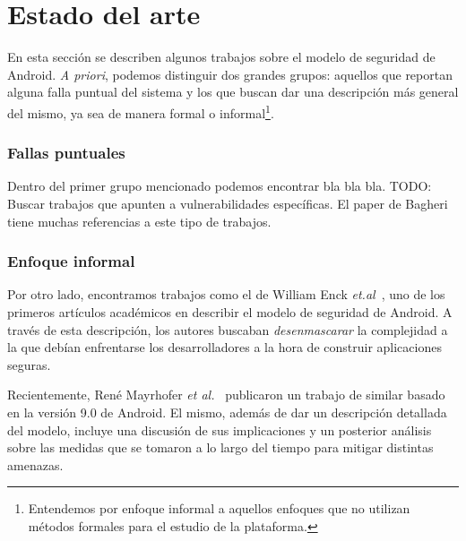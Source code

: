 
\chapter*{Estado del arte}
\label{chapter:estado}

En esta sección se describen algunos trabajos sobre el modelo de seguridad de
Android. \textit{A priori}, podemos distinguir dos grandes grupos: aquellos que
reportan alguna falla puntual del sistema y los que buscan dar una descripción
más general del mismo, ya sea de manera formal o informal\footnote{Entendemos
por enfoque informal a aquellos enfoques que no utilizan métodos formales para
el estudio de la plataforma.}.

\subsection*{Fallas puntuales}

Dentro del primer grupo mencionado podemos encontrar bla bla bla. TODO: Buscar
trabajos que apunten a vulnerabilidades específicas. El paper de Bagheri
\cite{bagheri} tiene muchas referencias a este tipo de trabajos.

\subsection*{Enfoque informal}

Por otro lado, encontramos trabajos como el de William Enck
\textit{et.al}~\cite{enck}, uno de los primeros artículos académicos en
describir el modelo de seguridad de Android. A través de esta descripción, los
autores buscaban \textit{desenmascarar} la complejidad a la que debían
enfrentarse
%
%
los desarrolladores a la hora de construir aplicaciones seguras.

Recientemente, René Mayrhofer \textit{et al.}~\cite{mayrhofer} publicaron un
%
%
trabajo de similar basado en la versión 9.0 de Android. El mismo, además de dar
un descripción detallada del modelo, incluye una discusión de sus implicaciones
y un posterior análisis sobre las medidas que se tomaron a lo largo del tiempo
para mitigar distintas amenazas.


